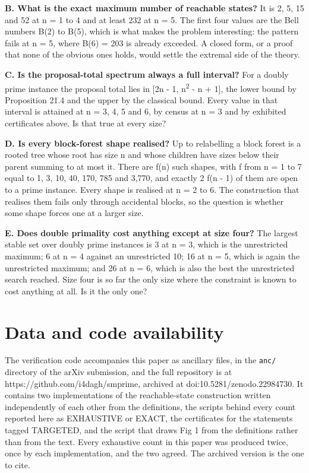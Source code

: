 \documentclass[
  11pt,
]{article}
\begin{document}
\textbf{B. What is the exact maximum number of reachable states?} It is
2, 5, 15 and 52 at n = 1 to 4 and at least 232 at n = 5. The first four
values are the Bell numbers B(2) to B(5), which is what makes the
problem interesting: the pattern fails at n = 5, where B(6) = 203 is
already exceeded. A closed form, or a proof that none of the obvious
ones holds, would settle the extremal side of the theory.

\textbf{C. Is the proposal-total spectrum always a full interval?} For a
doubly prime instance the proposal total lies in {[}2n - 1,
n\textsuperscript{2} - n + 1{]}, the lower bound by Proposition 21.4 and
the upper by the classical bound. Every value in that interval is
attained at n = 3, 4, 5 and 6, by census at n = 3 and by exhibited
certificates above. Is that true at every size?

\textbf{D. Is every block-forest shape realised?} Up to relabelling a
block forest is a rooted tree whose root has size n and whose children
have sizes below their parent summing to at most it. There are f(n) such
shapes, with f from n = 1 to 7 equal to 1, 3, 10, 40, 170, 785 and
3,770, and exactly 2 f(n - 1) of them are open to a prime instance.
Every shape is realised at n = 2 to 6. The construction that realises
them fails only through accidental blocks, so the question is whether
some shape forces one at a larger size.

\textbf{E. Does double primality cost anything except at size four?} The
largest stable set over doubly prime instances is 3 at n = 3, which is
the unrestricted maximum; 6 at n = 4 against an unrestricted 10; 16 at n
= 5, which is again the unrestricted maximum; and 26 at n = 6, which is
also the best the unrestricted search reached. Size four is so far the
only size where the constraint is known to cost anything at all. Is it
the only one?

\clearpage

\hypertarget{data-and-code-availability}{%
\section{Data and code availability}\label{data-and-code-availability}}

The verification code accompanies this paper as ancillary files, in the
\texttt{anc/} directory of the arXiv submission, and the full repository
is at https://github.com/i4dagh/smprime, archived at
doi:10.5281/zenodo.22984730. It contains two implementations of the
reachable-state construction written independently of each other from
the definitions, the scripts behind every count reported here as
EXHAUSTIVE or EXACT, the certificates for the statements tagged
TARGETED, and the script that draws Fig 1 from the definitions rather
than from the text. Every exhaustive count in this paper was produced
twice, once by each implementation, and the two agreed. The archived
version is the one to cite.
\end{document}
